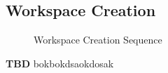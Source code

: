 \subsection{Workspace Creation}
\begin{figure}[hb]
    \centering
    \caption{Workspace Creation Sequence}
    \label{fig:seq-desktop-workspace-create}
\end{figure}
\textbf{TBD}
bokbokdsaokdosak

\newpage
